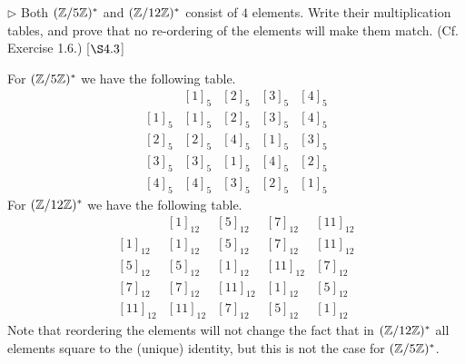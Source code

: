 \begin{exercise}
	$\triangleright$ Both $(\mathbb{Z}/5\mathbb{Z})^*$ and $(\mathbb{Z}/12\mathbb{Z})^*$ consist of $4$ elements. Write their multiplication tables, and prove that no re-ordering of the elements will make them match. (Cf. Exercise 1.6.) [$\S 4.3$]
\end{exercise}
\begin{solution}
	For $(\mathbb{Z}/5\mathbb{Z})^*$ we have the following table.
	{%
		\renewcommand{\arraystretch}{1.5}
	\[
		\begin{array}{c||c|c|c|c}
			& [1]_5 & [2]_5 & [3]_5 &  [4]_5\\
			\hline
			\hline
			[1]_5 & [1]_5 & [2]_5 & [3]_5 & [4]_5\\
			\hline
			[2]_5 & [2]_5 & [4]_5 & [1]_5 & [3]_5\\
			\hline
			[3]_5 & [3]_5 & [1]_5& [4]_5 & [2]_5 \\
			\hline
			[4]_5 & [4]_5 & [3]_5  & [2]_5 & [1]_5
		\end{array}
	\]
	}
	For $(\mathbb{Z}/12\mathbb{Z})^*$ we have the following table.
	{%
		\renewcommand{\arraystretch}{1.5}
		\[
		\begin{array}{c||c|c|c|c}
			& [1]_{12} & [5]_{12} & [7]_{12} &  [11]_{12}\\
			\hline
			\hline
			[1]_{12} & [1]_{12} & [5]_{12} & [7]_{12} & [11]_{12}\\
			\hline
			[5]_{12} & [5]_{12} & [1]_{12} & [11]_{12} & [7]_{12}\\
			\hline
			[7]_{12} & [7]_{12} & [11]_{12}& [1]_{12} & [5]_{12} \\
			\hline
			[11]_{12} & [11]_{12} & [7]_{12}  & [5]_{12} & [1]_{12}
		\end{array}
		\]
	}
	Note that reordering the elements will not change the fact that in $(\mathbb{Z}/12\mathbb{Z})^*$ all elements square to the (unique) identity, but this is not the case for $(\mathbb{Z}/5\mathbb{Z})^*$.
\end{solution}